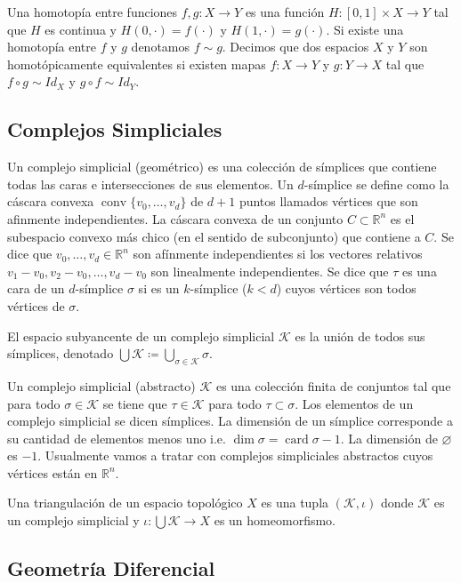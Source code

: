 \documentclass[legalpaper,12pt]{article}
\newcommand{\R}{\mathbb{R}}
\newcommand{\KK}{\mathcal{K}}
\DeclareMathOperator{\conv}{conv}
\DeclareMathOperator{\card}{card}
\begin{document}
Una homotopía entre funciones \(f,g\colon X \to Y\) es una función \(H\colon [0,1]\times X \to Y\)
tal que \(H\) es continua y \(H(0,\cdot) = f(\cdot)\) y \(H(1,\cdot) = g(\cdot)\). Si
existe una homotopía entre \(f\) y \(g\) denotamos \(f\sim g\).   
Decimos que dos espacios \(X\) y \(Y\) son homotópicamente equivalentes si existen
mapas \(f\colon X \to Y\) y \(g \colon Y \to X\) tal que \(f\circ g \sim Id_X\)
y \(g\circ f \sim Id_Y\). 

\subsection{Complejos Simpliciales}

Un complejo simplicial (geométrico) es una colección de símplices que contiene 
todas las caras e intersecciones de sus elementos. Un \(d\)-símplice se define
como la cáscara convexa \(\conv \lbrace v_0, \ldots, v_d\rbrace\) de \(d+1\) puntos
llamados vértices que son 
afinmente independientes. La cáscara convexa de un conjunto \(C\subset\R^n\) es
el subespacio convexo más chico (en el sentido de subconjunto) que contiene
a \(C\). Se dice que \(v_0, \ldots, v_d \in \R^n\) son afínmente independientes
si los vectores relativos \(v_1 -v_0, v_2-v_0, \ldots,v_d-v_0\) son linealmente
independientes. Se dice que \(\tau\) es una cara de un \(d\)-símplice \(\sigma\) 
si es un \(k\)-símplice (\(k<d\)) cuyos vértices son todos vértices de \(\sigma\).

El espacio subyancente de un complejo simplicial \(\KK\) es la unión de todos
sus símplices, denotado \(\bigcup \KK \coloneqq \bigcup_{\sigma\in\KK} \sigma\). 

Un complejo simplicial (abstracto) \(\KK\) es una colección finita de conjuntos
tal que para todo \(\sigma\in\KK\) se tiene que \(\tau\in \KK\) para todo \(\tau\subset\sigma\).
Los elementos de un complejo simplicial se dicen símplices. La dimensión de un símplice
corresponde a su cantidad de elementos menos uno i.e. \(\dim\sigma = \card \sigma-1\). 
La dimensión de \(\varnothing\) es \(-1\). Usualmente vamos a tratar con complejos
simpliciales abstractos cuyos vértices están en \(\R^n\). 

Una triangulación de un espacio topológico \(X\) es una tupla \((\KK,\iota)\) donde
\(\KK\) es un complejo simplicial y \(\iota\colon \bigcup \KK \to X\) es un homeomorfismo.  

\subsection{Geometría Diferencial}
\end{document}
